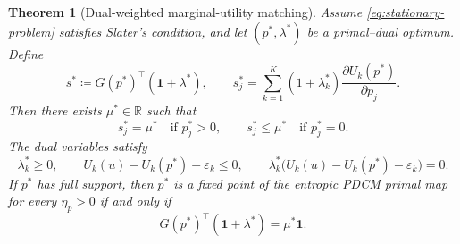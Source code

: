 \documentclass[11pt]{article}
\newtheorem{theorem}{Theorem}
\newcommand{\R}{\mathbb{R}}
\newcommand{\one}{\mathbf{1}}
\begin{document}
\begin{theorem}[Dual-weighted marginal-utility matching]
\label{thm:matching}
Assume \eqref{eq:stationary-problem} satisfies Slater's condition, and let $(p^*,\lambda^*)$ be a primal--dual optimum. Define
\begin{equation}
    s^*
    \coloneqq
    G(p^*)^\top(\one+\lambda^*),
    \qquad
    s_j^*
    =
    \sum_{k=1}^K
    (1+\lambda_k^*)
    \frac{\partial U_k(p^*)}{\partial p_j}.
    \label{eq:s-star}
\end{equation}
Then there exists $\mu^*\in\R$ such that
\begin{equation}
    s_j^*=\mu^*
    \quad\text{if }p_j^*>0,
    \qquad
    s_j^*\le\mu^*
    \quad\text{if }p_j^*=0.
    \label{eq:matching}
\end{equation}
The dual variables satisfy
\begin{equation}
    \lambda_k^*\ge0,
    \qquad
    U_k(u)-U_k(p^*)-\varepsilon_k\le0,
    \qquad
    \lambda_k^*\bigl(U_k(u)-U_k(p^*)-\varepsilon_k\bigr)=0.
    \label{eq:complementarity}
\end{equation}
If $p^*$ has full support, then $p^*$ is a fixed point of the entropic PDCM primal map for every $\eta_p>0$ if and only if
\begin{equation}
    G(p^*)^\top(\one+\lambda^*)=\mu^*\one.
    \label{eq:full-support-match}
\end{equation}
\end{theorem}
\end{document}

